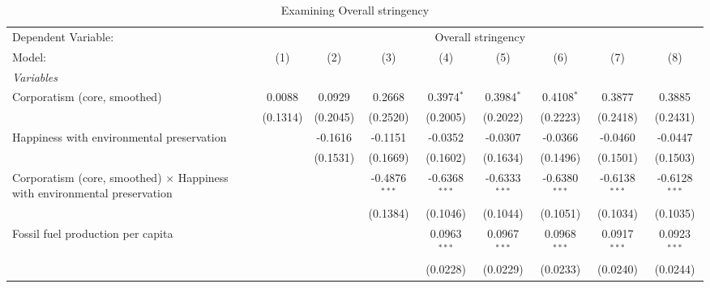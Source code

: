 
\begin{table}[htbp]
   \caption{Examining Overall stringency}
   \centering
   \begin{tabular}{lcccccccc}
      \tabularnewline \midrule \midrule
      Dependent Variable: & \multicolumn{8}{c}{Overall stringency}\\
      Model:                                                                           & (1)                   & (2)      & (3)             & (4)             & (5)             & (6)             & (7)             & (8)\\  
      \midrule
      \emph{Variables}\\
      Corporatism (core, smoothed)                                                     & 0.0088                & 0.0929   & 0.2668          & 0.3974$^{*}$    & 0.3984$^{*}$    & 0.4108$^{*}$    & 0.3877          & 0.3885\\   
                                                                                       & (0.1314)              & (0.2045) & (0.2520)        & (0.2005)        & (0.2022)        & (0.2223)        & (0.2418)        & (0.2431)\\   
      Happiness with environmental preservation                                        &                       & -0.1616  & -0.1151         & -0.0352         & -0.0307         & -0.0366         & -0.0460         & -0.0447\\   
                                                                                       &                       & (0.1531) & (0.1669)        & (0.1602)        & (0.1634)        & (0.1496)        & (0.1501)        & (0.1503)\\   
      Corporatism (core, smoothed) $\times$ Happiness with environmental preservation  &                       &          & -0.4876$^{***}$ & -0.6368$^{***}$ & -0.6333$^{***}$ & -0.6380$^{***}$ & -0.6138$^{***}$ & -0.6128$^{***}$\\   
                                                                                       &                       &          & (0.1384)        & (0.1046)        & (0.1044)        & (0.1051)        & (0.1034)        & (0.1035)\\   
      Fossil fuel production per capita                                                &                       &          &                 & 0.0963$^{***}$  & 0.0967$^{***}$  & 0.0968$^{***}$  & 0.0917$^{***}$  & 0.0923$^{***}$\\   
                                                                                       &                       &          &                 & (0.0228)        & (0.0229)        & (0.0233)        & (0.0240)        & (0.0244)\\   

\end{tabular}
\end{table}
